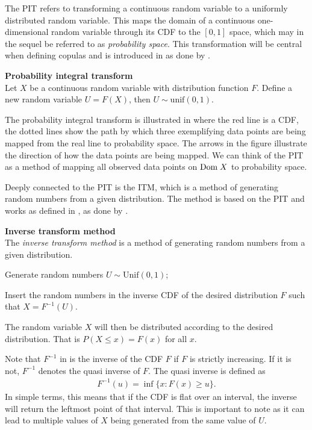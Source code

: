 The \gls{PIT} refers to transforming a continuous random variable to a uniformly distributed random variable. 
This maps the domain of a continuous one-dimensional random variable through its \gls{CDF} to the $[0,1]$ space, which may in the sequel be referred to as \emph{probability space}. This transformation will be central when defining copulas and is introduced in  as done by . 

\begin{theorem}\label{the:PIT} \textbf{Probability integral transform} \\
    Let $X$ be a continuous random variable with distribution function $F$. Define a new random variable $U = F(X)$, then $U \sim \mathrm{unif}(0,1)$. 
\end{theorem}

The probability integral transform is illustrated in  where the red line is a \gls{CDF}, the dotted lines show the path by which three exemplifying data points are being mapped from the real line to probability space. The arrows in the figure illustrate the direction of how the data points are being mapped. We can think of the \gls{PIT} as a method of mapping all observed data points on $\mathrm{Dom \;} X$ to probability space.

Deeply connected to the \gls{PIT} is the \gls{ITM}, which is a method of generating random numbers from a given distribution. The method is based on the \gls{PIT} and works as defined in , as done by .
\begin{definition}\label{def:InverseTransformMethod}
    \textbf{Inverse transform method} \\
    The \emph{inverse transform method} is a method of generating random numbers from a given distribution.
    \begin{compactenum}
        \item Generate random numbers $U \sim \mathrm{Unif}(0,1)$;
        \item Insert the random numbers in the inverse \gls{CDF} of the desired distribution $F$ such that $X = F^{-1}(U)$.
    \end{compactenum}
    The random variable $X$ will then be distributed according to the desired distribution. That is $P(X\leq x) = F(x)$ for all $x$. 
\end{definition}

\begin{remark}
    Note that $F^{-1}$ in  is the inverse of the \gls{CDF} $F$ if $F$ is strictly increasing. If it is not, $F^{-1}$ denotes the quasi inverse of $F$. The quasi inverse is defined as
    \begin{align*}
        F^{-1}(u) = \inf\{x : F(x) \geq u\}.
    \end{align*}
    In simple terms, this means that if the \gls{CDF} is flat over an interval, the inverse will return the leftmost point of that interval. This is important to note as it can lead to multiple values of $X$ being generated from the same value of $U$.
\end{remark}

